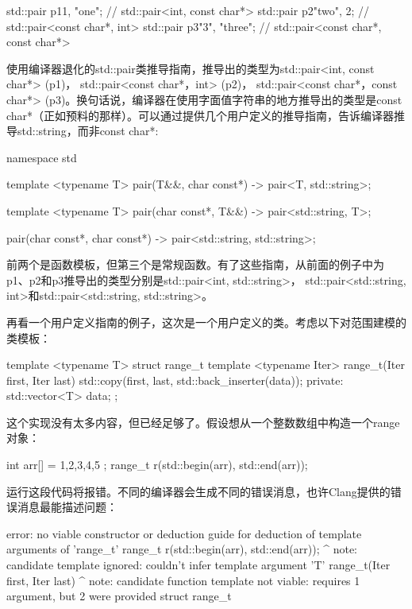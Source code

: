\begin{cppcode}
std::pair p1{1, "one"}; // std::pair<int, const char*>
std::pair p2{"two", 2}; // std::pair<const char*, int>
std::pair p3{"3", "three"};
// std::pair<const char*, const char*>
\end{cppcode}

使用编译器退化的std::pair类推导指南，推导出的类型为std::pair<int, const char*> (p1)， std::pair<const char*，int> (p2)， std::pair<const char*，const char*> (p3)。换句话说，编译器在使用字面值字符串的地方推导出的类型是const char*（正如预料的那样）。可以通过提供几个用户定义的推导指南，告诉编译器推导std::string，而非const char*:

\begin{cppcode}
namespace std
{
	template <typename T>
	pair(T&&, char const*) -> pair<T, std::string>;
	
	template <typename T>
	pair(char const*, T&&) -> pair<std::string, T>;
	
	pair(char const*, char const*) ->
	pair<std::string, std::string>;
}
\end{cppcode}

前两个是函数模板，但第三个是常规函数。有了这些指南，从前面的例子中为p1、p2和p3推导出的类型分别是std::pair<int, std::string>， std::pair<std::string, int>和std::pair<std::string, std::string>。

再看一个用户定义指南的例子，这次是一个用户定义的类。考虑以下对范围建模的类模板：

\begin{cppcode}
template <typename T>
struct range_t
{
	template <typename Iter>
	range_t(Iter first, Iter last)
	{
		std::copy(first, last, std::back_inserter(data));
	}
	private:
	std::vector<T> data;
};
\end{cppcode}

这个实现没有太多内容，但已经足够了。假设想从一个整数数组中构造一个range对象：

\begin{cppcode}
int arr[] = { 1,2,3,4,5 };
range_t r(std::begin(arr), std::end(arr));
\end{cppcode}

运行这段代码将报错。不同的编译器会生成不同的错误消息，也许Clang提供的错误消息最能描述问题：

\begin{shell}
error: no viable constructor or deduction guide for deduction
of template arguments of 'range_t'
range_t r(std::begin(arr), std::end(arr));
         ^
note: candidate template ignored: couldn't infer template
argument 'T'
range_t(Iter first, Iter last)
         ^
note: candidate function template not viable: requires 1
argument, but 2 were provided
struct range_t
\end{shell}

